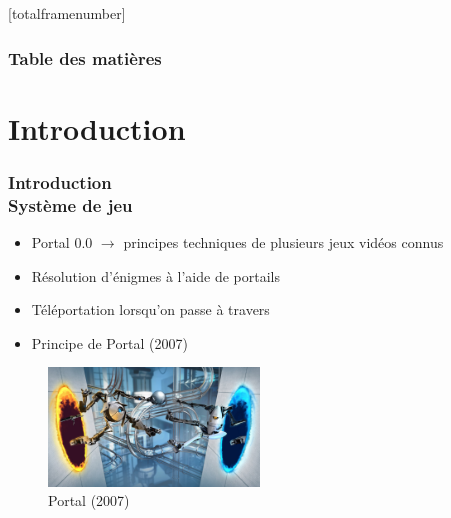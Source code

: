 \documentclass{beamer}
\begin{document}
\setcounter{framenumber}{0}
[totalframenumber]

\begin{frame}
    \frametitle{Table des matières}
    \tableofcontents
\end{frame}

\section{Introduction}

\begin{frame}
    \frametitle{Introduction \\
                \small Système de jeu}
    \begin{block}{}
        \begin{itemize}
            \item Portal 0.0 $\rightarrow $ principes techniques de plusieurs jeux vidéos connus
        \end{itemize}
    \end{block}
    \begin{block}{}
        \begin{itemize}
            \item Résolution d'énigmes à l'aide de portails
            \item Téléportation lorsqu'on passe à travers
            \item Principe de Portal (2007)
        \end{itemize}
    \end{block}
    \begin{figure}
        \centering
        \includegraphics[width=0.5\textwidth]{images/portal.jpg}
        \caption{Portal (2007)}
    \end{figure}
\end{frame}
\end{document}
